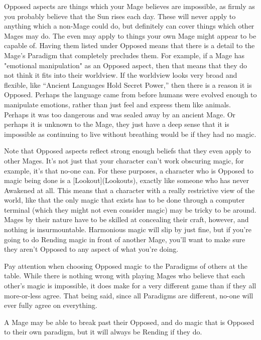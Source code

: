 \documentclass[
  oneside,
  statementpaper,
  9pt]{memoir}
\begin{document}
\begin{Player}

Opposed aspects are things which your Mage believes are impossible, as firmly as you probably believe that the Sun rises each day. These will never apply to anything which a non-Mage could do, but definitely can cover things which other Mages may do. The even may apply to things your own Mage might appear to be capable of. Having them listed under Opposed means that there is a detail to the Mage’s Paradigm that completely precludes them. For example, if a Mage has "emotional manipulation" as an Opposed aspect, then that means that they do not think it fits into their worldview. If the worldview looks very broad and flexible, like “Ancient Languages Hold Secret Power,” then there is a reason it is Opposed. Perhaps the language came from before humans were evolved enough to manipulate emotions, rather than just feel and express them like animals. Perhaps it was too dangerous and was sealed away by an ancient Mage. Or perhaps it is unknown to the Mage, they just have a deep sense that it is impossible as continuing to live without breathing would be if they had no magic.

Note that Opposed aspects reflect strong enough beliefs that they even apply to other Mages. It’s not just that your character can’t work obscuring magic, for example, it’s that no-one can. For these purposes, a character who is Opposed to magic being done is a [Lookout](Lookouts), exactly like someone who has never Awakened at all. This means that a character with a really restrictive view of the world, like that the only magic that exists has to be done through a computer terminal (which they might not even consider magic) may be tricky to be around. Mages by their nature have to be skilled at concealing their craft, however, and nothing is insurmountable. Harmonious magic will slip by just fine, but if you’re going to do Rending magic in front of another Mage, you’ll want to make sure they aren’t Opposed to any aspect of what you’re doing. 

Pay attention when choosing Opposed magic to the Paradigms of others at the table. While there is nothing wrong with playing Mages who believe that each other’s magic is impossible, it does make for a very different game than if they all more-or-less agree. That being said, since all Paradigms are different, no-one will ever fully agree on everything.

A Mage may be able to break past their Opposed, and do magic that is Opposed to their own paradigm, but it will always be Rending if they do.

\end{Player}
\end{document}
